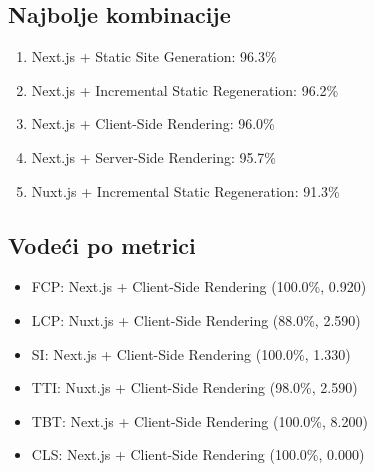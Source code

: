 \subsection{Najbolje kombinacije}
\begin{enumerate}
    \item Next.js + Static Site Generation: 96.3\%
    \item Next.js + Incremental Static Regeneration: 96.2\%
    \item Next.js + Client-Side Rendering: 96.0\%
    \item Next.js + Server-Side Rendering: 95.7\%
    \item Nuxt.js + Incremental Static Regeneration: 91.3\%
\end{enumerate}

\subsection{Vodeći po metrici}
\begin{itemize}
    \item FCP: Next.js + Client-Side Rendering (100.0\%, 0.920)
    \item LCP: Nuxt.js + Client-Side Rendering (88.0\%, 2.590)
    \item SI: Next.js + Client-Side Rendering (100.0\%, 1.330)
    \item TTI: Nuxt.js + Client-Side Rendering (98.0\%, 2.590)
    \item TBT: Next.js + Client-Side Rendering (100.0\%, 8.200)
    \item CLS: Next.js + Client-Side Rendering (100.0\%, 0.000)
\end{itemize}


